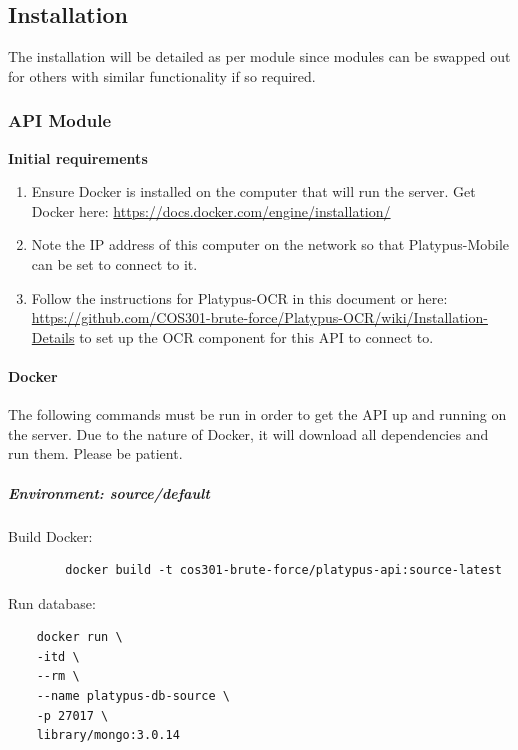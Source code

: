 \documentclass[12pt,a4paper]{article}
\begin{document}
       
    \subsection{Installation}
    The installation will be detailed as per module since modules can be swapped out for others with similar functionality if so required. 
    \subsubsection{API Module}
    \textbf{Initial requirements}
     	\begin{enumerate}
     	\item Ensure Docker is installed on the computer that will run the server. Get Docker here: \url{https://docs.docker.com/engine/installation/} 
        
        \item Note the IP address of this computer on the network so that Platypus-Mobile can be set to connect to it.
        
        \item Follow the instructions for Platypus-OCR in this document or  here: \url{https://github.com/COS301-brute-force/Platypus-OCR/wiki/Installation-Details} to set up the OCR component for this API to connect to.
     	\end{enumerate}
        
	\paragraph{Docker}
	The following commands must be run in order to get the API up and running on the server. Due to the nature of Docker, it will download all dependencies and run them. Please be patient.
    \vspace{1cm}
 
  \subparagraph{Environment:	source/default}  
    \subparagraph{}
	Build Docker:
    \begin{lstlisting}
		docker build -t cos301-brute-force/platypus-api:source-latest
	\end{lstlisting}
    
    \vspace{1cm}
    Run database:
    \begin{lstlisting}
    docker run \
  	-itd \
  	--rm \
  	--name platypus-db-source \
  	-p 27017 \
  	library/mongo:3.0.14
    \end{lstlisting}
    
    \vspace{1cm}
    
\end{document}
